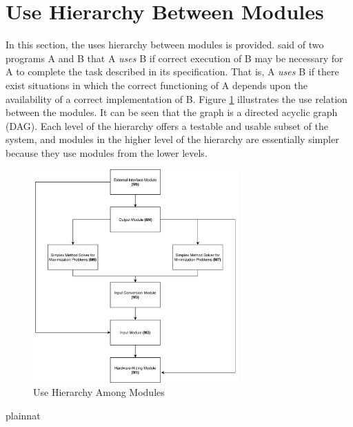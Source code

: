 \documentclass[12pt, titlepage]{article}
\begin{document}
\section{Use Hierarchy Between Modules} \label{SecUse}

In this section, the uses hierarchy between modules is
provided. \citet{Parnas1978} said of two programs A and B that A {\em uses} B if
correct execution of B may be necessary for A to complete the task described in
its specification. That is, A {\em uses} B if there exist situations in which
the correct functioning of A depends upon the availability of a correct
implementation of B.  Figure \ref{FigUH} illustrates the use relation between
the modules. It can be seen that the graph is a directed acyclic graph
(DAG). Each level of the hierarchy offers a testable and usable subset of the
system, and modules in the higher level of the hierarchy are essentially simpler
because they use modules from the lower levels.

\begin{figure}[H]
\centering
\includegraphics[width=0.7\textwidth]{UsesHierarchy.png}
\caption{Use Hierarchy Among Modules}
\label{FigUH}
\end{figure}

\newpage

 {plainnat}

\end{document}
